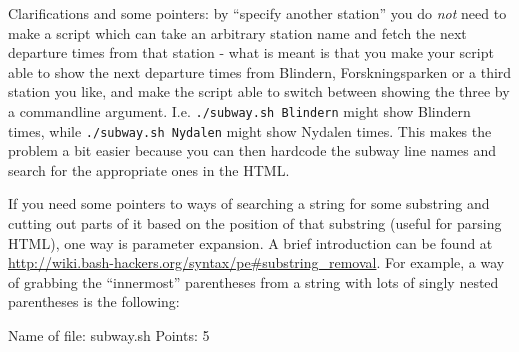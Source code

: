 \documentclass[english]{article}
\begin{document}
Clarifications and some pointers: by ``specify another station'' you do \emph{not} need to make a script which can take an arbitrary station name and fetch the next departure times from that station - what is meant is that you make your script able to show the next departure times from Blindern, Forskningsparken or a third station you like, and make the script able to switch between showing the three by a commandline argument. I.e. \texttt{./subway.sh Blindern} might show Blindern times, while \texttt{./subway.sh Nydalen} might show Nydalen times. This makes the problem a bit easier because you can then hardcode the subway line names and search for the appropriate ones in the HTML.


If you need some pointers to ways of searching a string for some substring and cutting out parts of it based on the position of that substring (useful for parsing HTML), one way is parameter expansion. A brief introduction can be found at \url{http://wiki.bash-hackers.org/syntax/pe#substring_removal}. For example, a way of grabbing the ``innermost'' parentheses from a string with lots of singly nested parentheses is the following:



Name of file: subway.sh
\newline
Points: 5
\end{document}
